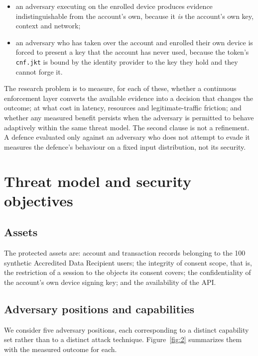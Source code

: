 \begin{itemize}
  \item an adversary executing on the enrolled device produces evidence indistinguishable from the account's own, because it \textit{is} the account's own key, context and network;
  \item an adversary who has taken over the account and enrolled their own device is forced to present a key that the account has never used, because the token's \texttt{cnf.jkt} is bound by the identity provider to the key they hold and they cannot forge it.
\end{itemize}

The research problem is to measure, for each of these, whether a continuous enforcement layer converts the available evidence into a decision that changes the outcome; at what cost in latency, resources and legitimate-traffic friction; and whether any measured benefit persists when the adversary is permitted to behave adaptively within the same threat model. The second clause is not a refinement. A defence evaluated only against an adversary who does not attempt to evade it measures the defence's behaviour on a fixed input distribution, not its security.

\section{Threat model and security objectives}
\label{sec:threatmodel}

\subsection{Assets}

The protected assets are: account and transaction records belonging to the 100 synthetic Accredited Data Recipient users; the integrity of consent scope, that is, the restriction of a session to the objects its consent covers; the confidentiality of the account's own device signing key; and the availability of the API.

\subsection{Adversary positions and capabilities}
\label{sec:adversary-positions}

We consider five adversary positions, each corresponding to a distinct capability set rather than to a distinct attack technique. Figure~\ref{fig:2} summarizes them with the measured outcome for each.


